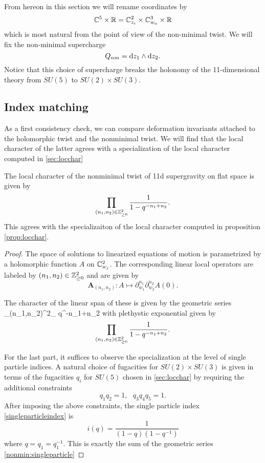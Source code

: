 From hereon in this section we will rename coordinates by
\[
\mathbb C^5 \times \mathbb R = \mathbb C^2_{z_i} \times \mathbb C^3_{w_a} \times \mathbb R
\]
which is most natural from the point of view of the non-minimal twist. 
We will fix the non-minimal supercharge 
\[
Q_{nm} = {\rm d} z_1 \wedge {\rm d} z_2 .
\]
Notice that this choice of supercharge breaks the holonomy of the 11-dimensional theory from $SU(5)$ to $SU(2) \times SU(3)$. 

\subsection{Index matching}
\label{sec:indexcheck}

As a first consistency check, we can compare deformation invariants attached to the holomorphic twist and the nonminimal twist. We will find that the local character of the latter agrees with a specialization of the local character computed in \ref{sec:locchar}

\begin{prop}
The  local character of the nonminimal twist of 11d supergravity on flat space is given by
\[
\prod _{(n_1,n_2)\in \mathbb{Z}^2_{\geq 0}} \frac{1}{1-q^{-n_1+n_2}}.
\] 
This agrees with the specializaiton of the local character computed in proposition \ref{prop:locchar}.
\end{prop}
\begin{proof}
The space of solutions to linearized equations of motion is parametrized by a holomorphic function $A$ on $\mathbb{C}^2_{w_j}$. The corresponding linear local operators are labeled by $(n_1,n_2)\in \mathbb{Z}^2_{\geq 0}$  and are given by 
\[
\boldsymbol{A}_{(n_1,n_2)} : A \mapsto \partial_{w_1}^{n_1}\partial_{w_2}^{n_2} A (0).
\]

The character of the linear span of these is given by the geometric series
\beqn\label{nonmin:singleparticle}
\sum _{(n_1,n_2)\in \Z^2_{}} q^{-n_1+n_2}
\eeqn
with plethystic exponential given by 
\[
\prod _{(n_1,n_2)\in \mathbb{Z}^2_{\geq 0}} \frac{1}{1-q^{-n_1+n_2}}.
\]

For the last part, it suffices to observe the specialization at the level of single particle indices. A natural choice of fugacities for $SU(2)\times SU(3)$ is given in terms of the fugacities $q_i$ for $SU(5)$ chosen in \ref{sec:locchar} by requiring the additional constraints \[q_1q_2 = 1, \ \ \ q_3q_4q_5=1.\]
After imposing the above constraints, the single particle index \ref{singleparticleindex} is
\[
i(q) = \frac{1}{(1-q)(1-q^{-1})}
\]
where $q = q_1=q_1^{-1}$. This is exactly the sum of the geometric series \ref{nonmin:singleparticle}

\end{proof}

